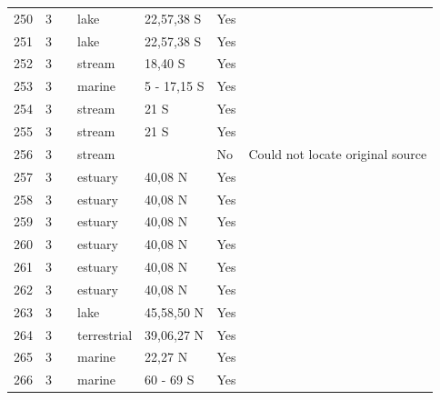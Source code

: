 \documentclass[12pt]{article}
\begin{document}
\begin{landscape}
\begin{table}[h!]
{\begin{tabular}{p{2.8cm}p{1.3cm}p{3cm}p{2.2cm}p{2.5cm}lp{8.2cm}}
        250   & 3 & \cite{Angelini2006}  & lake  & 22,57,38 S & Yes   &       \\
        251   & 3 & \cite{Angelini2006}  & lake  & 22,57,38 S & Yes   &       \\
        252   & 3 & \cite{Angelini2010}  & stream & 18,40 S & Yes   &       \\
        253   & 3 & \cite{Angelini2011}  & marine & 5 - 17,15 S & Yes   &       \\
        254   & 3 & \cite{Angelini2013}  & stream & 21 S  & Yes   &       \\
        255   & 3 & \cite{Angelini2013}  & stream & 21 S  & Yes   &       \\
        256   & 3 & \cite{Angelini2013}  & stream &       & No    & Could not locate original source \\
        257   & 3 & \cite{Baeta2011}  & estuary & 40,08 N & Yes   &       \\
        258   & 3 & \cite{Baeta2011}  & estuary & 40,08 N & Yes   &       \\
        259   & 3 & \cite{Baeta2011}  & estuary & 40,08 N & Yes   &       \\
        260   & 3 & \cite{Baeta2011}  & estuary & 40,08 N & Yes   &       \\
        261   & 3 & \cite{Baeta2011}  & estuary & 40,08 N & Yes   &       \\
        262   & 3 & \cite{Baeta2011}  & estuary & 40,08 N & Yes   &       \\
        263   & 3 & \cite{Schneider1997}    & lake  & 45,58,50 N & Yes   &       \\
        264   & 3 & \cite{Stagliano2002}    & terrestrial & 39,06,27 N & Yes   &       \\
        265   & 3 & \cite{Lin2006}  & marine & 22,27 N & Yes   &       \\
        266   & 3 & \cite{Cornejo-Donoso2008}  & marine & 60 - 69 S & Yes   &       \\
         \hline
      \end{tabular}}%
      \end{table}

        \newpage


\end{landscape}
\end{document}
